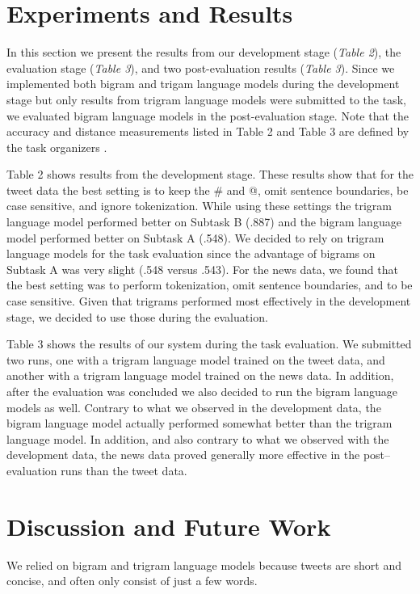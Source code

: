 \documentclass[11pt,a4paper]{article}
\begin{document}
\section{Experiments and Results}

In this section we present the results from our development stage (\textit{Table 2}), 
the evaluation stage (\textit{Table 3}), and two post-evaluation results 
(\textit{Table 3}). Since we implemented both bigram and trigam language models during the 
development stage but only results from trigram language models were submitted to the task, 
we evaluated bigram language models in the post-evaluation stage. Note that the accuracy and 
distance measurements listed in Table 2 and Table 3 are defined by the task organizers 
\cite{PotashRR17}. 

Table 2 shows results from the development stage. These results show 
that for the tweet data the best setting is to keep 
the \# and @, omit sentence boundaries, be case sensitive, and ignore 
tokenization. While using these settings the trigram language model
performed better on Subtask B (.887) and the bigram 
language model performed better on Subtask A (.548). We decided to rely
on trigram language models for the task evaluation since the advantage
of bigrams on Subtask A was very slight (.548 versus .543). 
For the news data, we found that the best setting was to 
perform tokenization, omit sentence boundaries, and to be case
sensitive. Given that trigrams performed most effectively in the 
development stage, we decided to use those during the evaluation. 

Table 3 shows the results of our system during the task evaluation. We submitted
two runs, one with a trigram language model trained on the tweet data, and another
with a trigram language model trained on the news data. In addition, after
the evaluation was concluded we also decided to run the bigram language models as well.
Contrary to what we observed in the development data, the bigram language 
model actually performed somewhat better than the trigram
language model. In addition, and also contrary to what we observed with the
development data, the news data proved generally more effective in the
post--evaluation runs than the tweet data. 

\section{Discussion and Future Work}

We relied on bigram and trigram language models because 
tweets are short and concise, and often only consist of just
a few words. 
\end{document}
